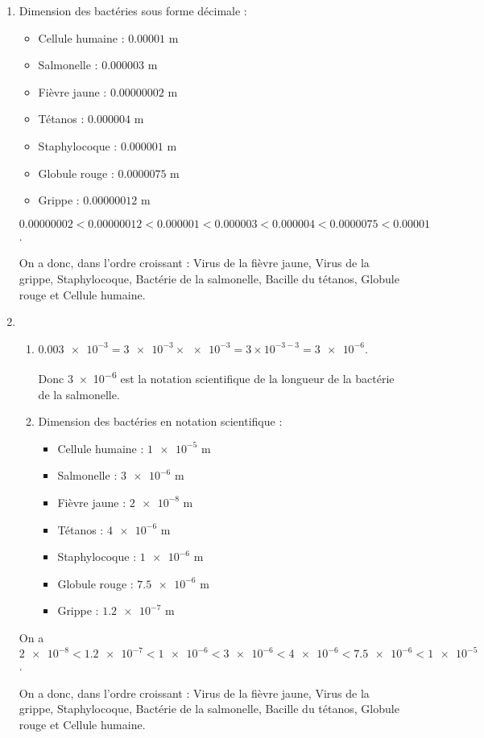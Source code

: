 \documentclass[12pt,a4paper]{article}
\begin{document}
\begin{enumerate}[label=\arabic*) ]
	\item Dimension des bactéries sous forme décimale :
		\begin{itemize}
			\item Cellule humaine : $\num{0.00001}$ m
			\item  Salmonelle : $\num{0.000003}$ m
			\item Fièvre jaune : $\num{0.00000002}$ m
			\item Tétanos : $\num{0.000004}$ m
			\item Staphylocoque : $\num{0.000001}$ m
			\item Globule rouge : $\num{0.0000075}$ m
			\item Grippe : $\num{0.00000012}$ m
		\end{itemize}
		
		$\num{0.00000002} < \num{0.00000012} < \num{0.000001} < \num{0.000003} < \num{0.000004} < \num{0.0000075} < \num{0.00001} $.
		
		On a donc, dans l'ordre croissant : Virus de la fièvre jaune, Virus de la grippe, Staphylocoque, Bactérie de la salmonelle, Bacille du tétanos, Globule rouge et Cellule humaine.
		
	\item 
		\begin{enumerate}[label=\alph*. ]
			\item $\num{0.003 e-3} = \num{3e-3} \times \num{e-3}= \num{3} \times 10^{-3-3} = \num{3e-6}$.
			
			Donc \num{3e-6} est la notation scientifique de la longueur de la bactérie de la salmonelle.	
			
			\item Dimension des bactéries en notation scientifique :
			\begin{itemize}
				\item Cellule humaine : $\num{1e-5}$ m
				\item Salmonelle : $\num{3e-6}$ m
				\item Fièvre jaune : $\num{2e-8}$ m
				\item Tétanos : $\num{4e-6}$ m
				\item Staphylocoque : $\num{1e-6}$ m
				\item Globule rouge : $\num{7.5e-6}$ m
				\item Grippe : $\num{1.2e-7}$ m
			\end{itemize}
		\end{enumerate}
		
		On a $\num{2e-8} < \num{1.2e-7} < \num{1e-6} < \num{3e-6} < \num{4e-6} < \num{7.5e-6} < \num{1e-5}$.

		On a donc, dans l'ordre croissant : Virus de la fièvre jaune, Virus de la grippe, Staphylocoque, Bactérie de la salmonelle, Bacille du tétanos, Globule rouge et Cellule humaine.	
	
\end{enumerate}
\end{document}
